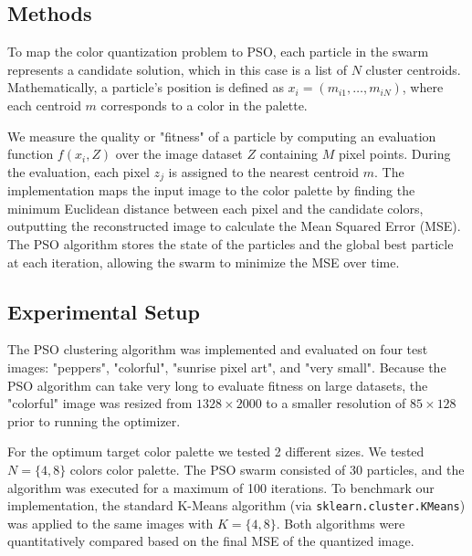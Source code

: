 \documentclass{article}
\begin{document}
\subsection{Methods}
To map the color quantization problem to PSO, each particle in the swarm represents a candidate solution, 
which in this case is a list of $N$ cluster centroids. Mathematically, a particle's position is defined 
as $x_i = (m_{i1}, \dots, m_{iN})$, where each centroid $m$ corresponds to a color in the palette. 

We measure the quality or "fitness" of a particle by computing an evaluation function $f(x_i, Z)$ over 
the image dataset $Z$ containing $M$ pixel points. During the evaluation, each pixel $z_j$ is assigned 
to the nearest centroid $m$. The implementation maps the input image to the color palette by finding 
the minimum Euclidean distance between each pixel and the candidate colors, outputting the reconstructed 
image to calculate the Mean Squared Error (MSE). The PSO algorithm stores the state of the particles and 
the global best particle at each iteration, allowing the swarm to minimize the MSE over time.

\subsection{Experimental Setup}
The PSO clustering algorithm was implemented and evaluated on four test images: "peppers", "colorful", 
"sunrise pixel art", and "very small". Because the PSO algorithm can take very long to evaluate fitness 
on large datasets, the "colorful" image was resized from $1328 \times 2000$ to a smaller resolution of 
$85 \times 128$ prior to running the optimizer.

For the optimum target color palette we tested 2 different sizes. We tested $N = \{4,8\}$ colors color 
palette. The PSO swarm consisted of 30 particles, and the algorithm was executed for a maximum of 100 
iterations. To benchmark our implementation, the standard K-Means algorithm (via \texttt{sklearn.cluster.KMeans}) 
was applied to the same images with $K= \{4,8\}$. Both algorithms were quantitatively compared based on the 
final MSE of the quantized image.
\end{document}
